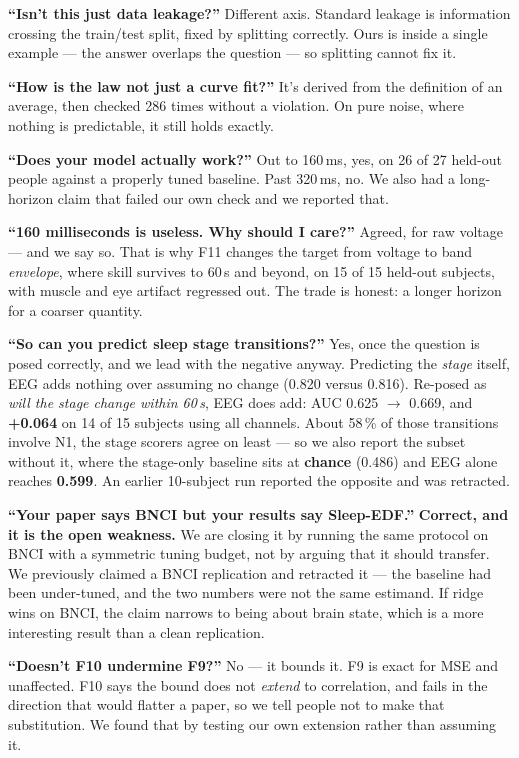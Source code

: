 \documentclass[11pt]{article}
\begin{document}
\textbf{``Isn't this just data leakage?''} Different axis. Standard leakage is
information crossing the train/test split, fixed by splitting correctly. Ours is
inside a single example --- the answer overlaps the question --- so splitting
cannot fix it.

\textbf{``How is the law not just a curve fit?''} It's derived from the definition
of an average, then checked 286 times without a violation. On pure noise, where
nothing is predictable, it still holds exactly.

\textbf{``Does your model actually work?''} Out to 160\,ms, yes, on 26 of 27
held-out people against a properly tuned baseline. Past 320\,ms, no. We also had a
long-horizon claim that failed our own check and we reported that.

\textbf{``160 milliseconds is useless. Why should I care?''} Agreed, for raw
voltage --- and we say so. That is why F11 changes the target from voltage to band
\emph{envelope}, where skill survives to 60\,s and beyond, on 15 of 15 held-out
subjects, with muscle and eye artifact regressed out. The trade is honest: a
longer horizon for a coarser quantity.

\textbf{``So can you predict sleep stage transitions?''} Yes, once the question is
posed correctly, and we lead with the negative anyway. Predicting the \emph{stage}
itself, EEG adds nothing over assuming no change (0.820 versus 0.816). Re-posed as
\emph{will the stage change within 60\,s}, EEG does add: AUC 0.625
$\rightarrow$ 0.669, and \textbf{+0.064} on 14 of 15 subjects using all channels.
About 58\,\% of those transitions involve N1, the stage scorers agree on
least --- so we also report the subset without it, where the stage-only baseline
sits at \textbf{chance} (0.486) and EEG alone reaches \textbf{0.599}. An earlier
10-subject run reported the opposite and was retracted.

\textbf{``Your paper says BNCI but your results say Sleep-EDF.''} \textbf{Correct,
and it is the open weakness.} We are closing it by running the same protocol on
BNCI with a symmetric tuning budget, not by arguing that it should transfer. We
previously claimed a BNCI replication and retracted it --- the baseline had been
under-tuned, and the two numbers were not the same estimand. If ridge wins on
BNCI, the claim narrows to being about brain state, which is a more interesting
result than a clean replication.

\textbf{``Doesn't F10 undermine F9?''} No --- it bounds it. F9 is exact for MSE and
unaffected. F10 says the bound does not \emph{extend} to correlation, and fails in
the direction that would flatter a paper, so we tell people not to make that
substitution. We found that by testing our own extension rather than assuming it.
\end{document}
